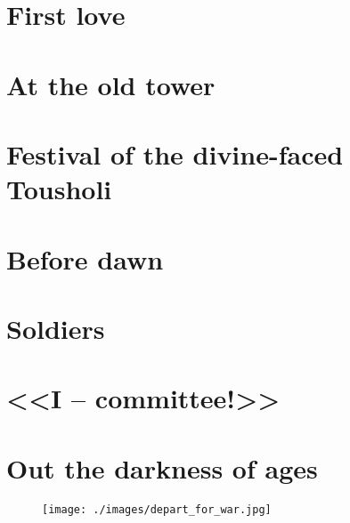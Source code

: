 \documentclass[smalldemyvopaper,11pt,twoside,onecolumn,openright,extrafontsizes]{memoir}
\begin{document}
\chapter{First love}
\chapter{At the old tower}
\chapter{Festival of the divine-faced Tousholi}
\chapter{Before dawn}
\chapter{Soldiers}
\chapter{<<I -- committee!>>}
\chapter{Out the darkness of ages}

\pagestyle{empty}
\cleardoublepage
\begin{figure}
    \centering
    \texttt{[image: ./images/depart\_for\_war.jpg]}
    \label{fig:mountain_village}
\end{figure}
\end{document}
